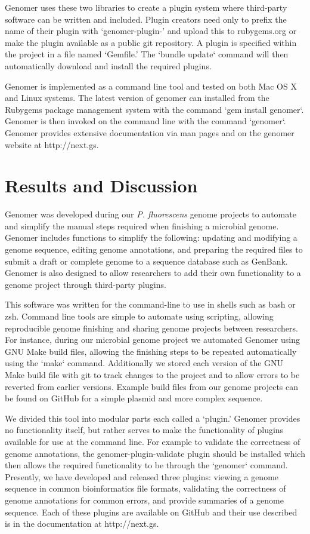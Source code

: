 \documentclass[10pt]{article}
\begin{document}
Genomer uses these two libraries to create a plugin system where third-party
software can be written and included. Plugin creators need only to prefix the
name of their plugin with `genomer-plugin-' and upload this to rubygems.org or
make the plugin available as a public git repository. A plugin is specified
within the project in a file named `Gemfile.' The `bundle update` command will
then automatically download and install the required plugins.

Genomer is implemented as a command line tool and tested on both Mac OS X and
Linux systems. The latest version of genomer can installed from the Rubygems
package management system with the command `gem install genomer`. Genomer is
then invoked on the command line with the command `genomer`. Genomer provides
extensive documentation via man pages and on the genomer website at
http://next.gs.

\section*{Results and Discussion}

Genomer was developed during our \emph{P. fluorescens} genome projects
\cite{barton2012} to automate and simplify the manual steps required when
finishing a microbial genome. Genomer includes functions to simplify the
following: updating and modifying a genome sequence, editing genome
annotations, and preparing the required files to submit a draft or complete
genome to a sequence database such as GenBank. Genomer is also designed to
allow researchers to add their own functionality to a genome project through
third-party plugins.

This software was written for the command-line to use in shells such as bash or
zsh. Command line tools are simple to automate using scripting, allowing
reproducible genome finishing and sharing genome projects between researchers.
For instance, during our microbial genome project we automated Genomer using
GNU Make build files, allowing the finishing steps to be repeated automatically
using the `make` command. Additionally we stored each version of the GNU Make
build file with git \cite{git-scm} to track changes to the project and to allow
errors to be reverted from earlier versions. Example build files from our
genome projects can be found on GitHub for a simple plasmid
\cite{plasmid-github} and more complex \cite{genome-github} sequence.

We divided this tool into modular parts each called a `plugin.' Genomer
provides no functionality itself, but rather serves to make the functionality
of plugins available for use at the command line. For example to validate the
correctness of genome annotations, the genomer-plugin-validate plugin should be
installed which then allows the required functionality to be through the
`genomer` command. Presently, we have developed and released three plugins:
viewing a genome sequence in common bioinformatics file formats, validating the
correctness of genome annotations for common errors, and provide summaries of a
genome sequence. Each of these plugins are available on GitHub and their use
described is in the documentation at http://next.gs.
\end{document}
